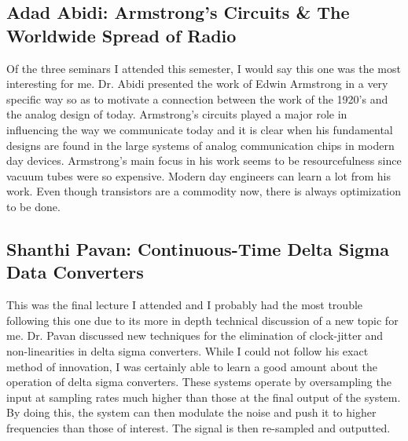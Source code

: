 \documentclass[journal]{IEEEtran}
\begin{document}
\subsection{Adad Abidi: Armstrong's Circuits \& The Worldwide Spread of Radio}
Of the three seminars I attended this semester, I would say this one was the most interesting for me. Dr. Abidi presented the work of Edwin Armstrong in a very specific way so as to motivate a connection between the work of the 1920's and the analog design of today. Armstrong's circuits played a major role in influencing the way we communicate today and it is	clear when his fundamental designs are found in the large systems of analog communication chips in modern day devices. Armstrong's main focus in his work seems to be resourcefulness since vacuum tubes were so expensive. Modern day engineers can learn a lot from his work. Even though transistors are a commodity now, there is always optimization to be done.

\subsection{Shanthi Pavan: Continuous-Time Delta Sigma Data Converters}
This was the final lecture I attended and I probably had the most trouble following this one due to its more in depth technical discussion of a new topic for me. Dr. Pavan discussed new techniques for the elimination of clock-jitter and non-linearities in delta sigma converters. While I could not follow his exact method of innovation, I was certainly able to learn a good amount about the operation of delta sigma converters. These systems operate by oversampling the input at sampling rates much higher than those at the final output of the system. By doing this, the system can then modulate the noise and push it to higher frequencies than those of interest. The signal is then re-sampled and outputted.
\end{document}
